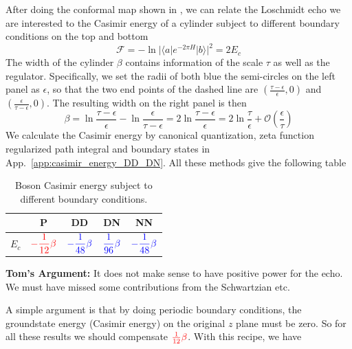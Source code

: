 \documentclass{article}
\begin{document}
After doing the conformal map shown in \label{fig:fig_H}, we can relate the Loschmidt echo we are interested to the Casimir energy of a cylinder subject to different boundary conditions on the top and bottom
\begin{equation}
\mathcal{F} = - \ln |\langle a | e^{- 2\pi H} | b \rangle |^2 = 2 E_c 
\end{equation}
The width of the cylinder $\beta$ contains information of the scale $\tau$ as well as the regulator. Specifically, we set the radii of both blue the semi-circles on the left panel as $\epsilon$, so that the two end points of the dashed line are $(\frac{\tau - \epsilon}{\epsilon}, 0 )$ and $ (\frac{\epsilon}{ \tau - \epsilon}, 0 )$. The resulting width on the right panel is then
\begin{equation}
\beta  = \ln  \frac{\tau - \epsilon}{\epsilon} -  \ln \frac{\epsilon}{ \tau - \epsilon}  = 2 \ln \frac{\tau - \epsilon}{ \epsilon} 
= 2 \ln \frac{\tau}{\epsilon} + \mathcal{O}(\frac{\epsilon}{\tau})
\end{equation}
We calculate the Casimir energy by canonical quantization, zeta function regularized path integral and boundary states in App.~\ref{app:casimir_energy_DD_DN}. All these methods give the following table
\begin{table}[h]
\begin{center}
\begin{tabular}{ |c|c|c|c|c| } 
 \hline
  & P & DD & DN & NN \\ \hline  \rule[4ex]{0pt}{1pt}
  $E_c $ & $ {\color{red} - \dfrac{1}{12}\beta } $ & ${\color{blue}- \dfrac{1}{48} \beta }$ & ${\color{blue} \dfrac{1}{96} \beta }$ &  ${\color{blue}- \dfrac{1}{48} \beta }$ \\[2ex]
 \hline
\end{tabular}
\end{center}
\caption{Boson Casimir energy subject to different boundary conditions.}
\label{tab:casimir}
\end{table}

{\bf Tom's Argument: } It does not make sense to have positive power for the echo. We must have missed some contributions from the Schwartzian etc. 

A simple argument is that by doing periodic boundary conditions, the groundstate energy (Casimir energy) on the original $z$ plane must be zero. So for all these results we should compensate ${\color{red}\frac{1}{12}\beta}$. With this recipe, we have
\end{document}
